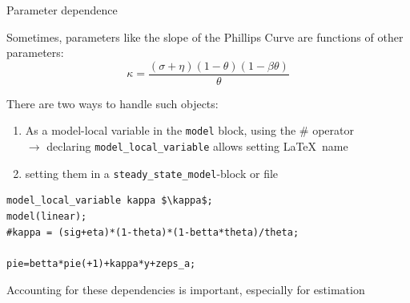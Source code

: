 \documentclass[handout,usepdftitle=false,xcolor=dvipsnames,aspectratio=169]{beamer}
\begin{document}
\begin{frame}[fragile]{Parameter dependence}
\begin{witemize}
    \item Sometimes, parameters like the slope of the Phillips Curve are functions of other parameters:
    \begin{equation}
      \kappa=\frac{(\sigma+\eta)(1-\theta)(1-\beta\theta)}{\theta}
    \end{equation}
    \item There are two ways to handle such objects:
    \begin{enumerate}
        \item As a model-local variable in the \texttt{model} block, using the \# operator\\
        $\rightarrow$ declaring \texttt{model\_local\_variable} allows setting \LaTeX\ name
        \item setting them in a \texttt{steady\_state\_model}-block or file
    \end{enumerate}

\begin{verbatim}
model_local_variable kappa $\kappa$;
model(linear);
#kappa = (sig+eta)*(1-theta)*(1-betta*theta)/theta;

pie=betta*pie(+1)+kappa*y+zeps_a;
\end{verbatim}
    \item Accounting for these dependencies is important, especially for estimation
\end{witemize}
\end{frame}
\end{document}
